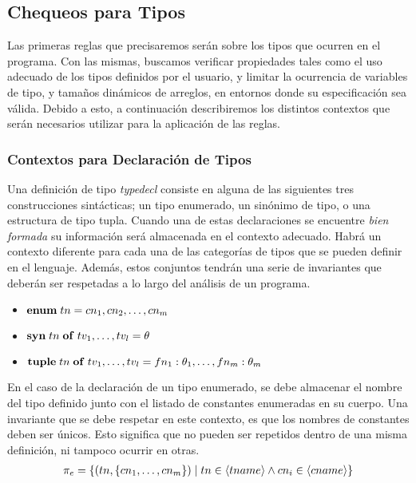 \subsection{Chequeos para Tipos}

Las primeras reglas que precisaremos serán sobre los tipos que ocurren en el programa.
Con las mismas, buscamos verificar propiedades tales como el uso adecuado de los tipos definidos por el usuario, y limitar la ocurrencia de variables de tipo, y tamaños dinámicos de arreglos, en entornos donde su especificación sea válida.
Debido a esto, a continuación describiremos los distintos contextos que serán necesarios utilizar para la aplicación de las reglas.

\subsubsection{Contextos para Declaración de Tipos}

Una definición de tipo \textit{typedecl} consiste en alguna de las siguientes tres construcciones sintácticas; un tipo enumerado, un sinónimo de tipo, o una estructura de tipo tupla.
Cuando una de estas declaraciones se encuentre \textit{bien formada} su información será almacenada en el contexto adecuado.
Habrá un contexto diferente para cada una de las categorías de tipos que se pueden definir en el lenguaje.
Además, estos conjuntos tendrán una serie de invariantes que deberán ser respetadas a lo largo del análisis de un programa.

\begin{itemize}
    \item $\mathbf{enum} \; tn = cn_1, cn_2, \ldots, cn_m$
    \item $\mathbf{syn} \; tn \; \mathbf{of} \; tv_1, \ldots, tv_l = \theta$
    \item $\mathbf{tuple} \; tn \; \mathbf{of} \; tv_1, \ldots, tv_l = fn_1 : \theta_1, \ldots, fn_m : \theta_m$
\end{itemize}

En el caso de la declaración de un tipo enumerado, se debe almacenar el nombre del tipo definido junto con el listado de constantes enumeradas en su cuerpo.
Una invariante que se debe respetar en este contexto, es que los nombres de constantes deben ser únicos.
Esto significa que no pueden ser repetidos dentro de una misma definición, ni tampoco ocurrir en otras.
\begin{gather*}
\pi_{e} =
\{ 
(tn, \{ cn_1, \ldots, cn_m \} ) \mid 
tn \in \langle tname \rangle 
\wedge 
cn_i \in \langle cname \rangle
\}
\end{gather*}

